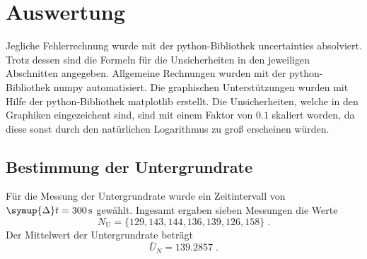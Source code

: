 \section{Auswertung}
\label{sec:Auswertung}
Jegliche Fehlerrechnung wurde mit der python-Bibliothek uncertainties \cite{uncertainties} absolviert.
Trotz dessen sind die Formeln für die Unsicherheiten in den jeweiligen Abschnitten angegeben.
Allgemeine Rechnungen wurden mit der python-Bibliothek numpy \cite{numpy} automatisiert. 
Die graphischen Unterstützungen wurden mit Hilfe der python-Bibliothek matplotlib \cite{matplotlib} erstellt.
Die Unsicherheiten, welche in den Graphiken eingezeichent sind, sind mit einem Faktor von $0.1$ skaliert worden, da diese sonst durch den
natürlichen Logarithmus zu groß erscheinen würden.
\subsection{Bestimmung der Untergrundrate}
Für die Messung der Untergrundrate wurde ein Zeitintervall von $\symup{\Delta} t = \SI{300}{\second}$ gewählt.
Ingesamt ergaben sieben Messungen die Werte
\begin{equation*}
    N_\text{U} = \{ 129, 143, 144, 136, 139, 126, 158 \} \; \text{.}
\end{equation*}
Der Mittelwert der Untergrundrate beträgt
\begin{equation*}
    \bar{U}_N = 139.2857 \; \text{.}
\end{equation*}
